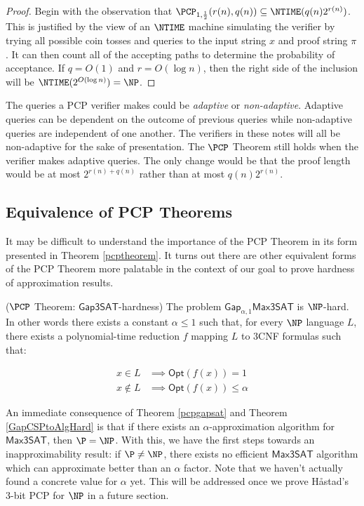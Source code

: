 \begin{proof}
Begin with the observation that $\PCP_{1,\frac{1}{2}}(r(n), q(n)) \subseteq \NTIME(q(n)2^{r(n)})$. This is justified by the view of an $\NTIME$ machine simulating the verifier by trying all possible coin tosses and queries to the input string $x$ and proof string $\pi$. It can then count all of the accepting paths to determine the probability of acceptance. If $q = O(1)$ and $r = O(\log{n})$, then the right side of the inclusion will be $\NTIME(2^{O(\log{n})}) = \NP$.
\end{proof}

\begin{remark}
  The queries a PCP verifier makes could be \emph{adaptive} or \emph{non-adaptive}. Adaptive queries can be dependent on the outcome of previous queries while non-adaptive queries are independent of one another. The verifiers in these notes will all be non-adaptive for the sake of presentation. The $\PCP$ Theorem still holds when the verifier makes adaptive queries. The only change would be that the proof length would be at most $2^{r(n) + q(n)}$ rather than at most $q(n)2^{r(n)}$.
\end{remark}


%
\subsection{Equivalence of PCP Theorems}
It may be difficult to understand the importance of the PCP Theorem in its form presented in Theorem \ref{pcptheorem}. It turns out there are other equivalent forms of the PCP Theorem more palatable in the context of our goal to prove hardness of approximation results.

\begin{theorem} \label{pcpgapsat}($\PCP$ Theorem: $\mathsf{Gap3SAT}$-hardness)
The problem $\mathsf{Gap}_{\alpha,1}\mathsf{Max3SAT}$ is $\NP$-hard. In other words there exists a constant $\alpha  \leq 1$ such that, for every $\NP$ language $L$, there exists a polynomial-time reduction $f$ mapping $L$ to 3CNF formulas such that:

\begin{align*}
  x \in L & \implies \mathsf{Opt}(f(x)) = 1 \\
  x \not\in L & \implies \mathsf{Opt}(f(x)) \leq \alpha
\end{align*}
\end{theorem}

An immediate consequence of Theorem \ref{pcpgapsat} and Theorem \ref{GapCSPtoAlgHard} is that if there exists an $\alpha$-approximation algorithm for $\mathsf{Max3SAT}$, then $\P = \NP$. With this, we have the first steps towards an inapproximability result: if $\P \neq \NP$, there exists no efficient $\mathsf{Max3SAT}$ algorithm which can approximate better than an $\alpha$ factor. Note that we haven't actually found a concrete value for $\alpha$ yet. This will be addressed once we prove H\aa stad's 3-bit PCP for $\NP$ in a future section.


